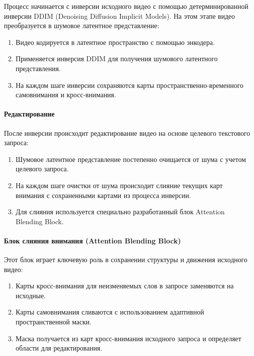 Процесс начинается с инверсии исходного видео с помощью детерминированной инверсии DDIM (Denoising Diffusion Implicit Models). На этом этапе видео преобразуется в шумовое латентное представление:

\begin{enumerate}
    \item Видео кодируется в латентное пространство с помощью энкодера.
    \item Применяется инверсия DDIM для получения шумового латентного представления.
    \item На каждом шаге инверсии сохраняются карты пространственно-временного самовнимания и кросс-внимания.
\end{enumerate}

\paragraph{Редактирование}

После инверсии происходит редактирование видео на основе целевого текстового запроса:

\begin{enumerate}
    \item Шумовое латентное представление постепенно очищается от шума с учетом целевого запроса.
    \item На каждом шаге очистки от шума происходит слияние текущих карт внимания с сохраненными картами из процесса инверсии.
    \item Для слияния используется специально разработанный блок Attention Blending Block.
\end{enumerate}

\paragraph{Блок слияния внимания (Attention Blending Block)}

Этот блок играет ключевую роль в сохранении структуры и движения исходного видео:

\begin{enumerate}
    \item  Карты кросс-внимания для неизменяемых слов в запросе заменяются на исходные.
    \item  Карты самовнимания сливаются с использованием адаптивной пространственной маски.
    \item  Маска получается из карт кросс-внимания исходного запроса и определяет области для редактирования.
\end{enumerate}

